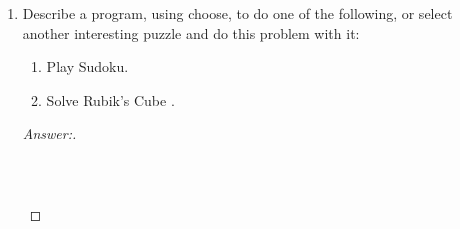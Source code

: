\documentclass[10pt]{article}
\begin{document}
\begin{enumerate}
\begin{enumerate}
\item
FIN (the set of finite languages) under the function $oddsL$, defined on languages as follows: $oddsL(L) = \{w : \exists x \in L (w = odds(x))\}$ 
\begin{proof}[Answer:]
Yes.
\end{proof}
\begin{proof}
The subset of a finite language must also be finite, and $oddsL(L) \subseteq L$, so FIN is closed under $oddsL$.
\end{proof}

\item
* INF (the set of infinite languages) under the function $oddsL$.
\begin{proof}[Answer:]
\end{proof}
\begin{proof}
\end{proof}

\item
FIN under the function $maxstring$, defined in Example 8.22.
\begin{proof}[Answer:]
Yes.
\end{proof}
\begin{proof}
The subset of a finite language must also be finite, and $maxstring(L) \subseteq L$, so FIN is closed under $maxstring$.
\end{proof}

\item
INF under the function $maxstring$. 
\begin{proof}[Answer:]
No.  The closure is INF $\cup$ FIN
\end{proof}
\begin{proof}
The language $a^*b^* \in$ INF.  $maxstring(a^*b^*) = \emptyset$, which is finite, and so not in INF.
\end{proof}
\end{enumerate}


\item
Describe a program, using choose, to do one of the following, or select another interesting puzzle and do this problem with it:
\begin{enumerate}

\item
Play Sudoku.

\item
Solve Rubik's Cube \textregistered .
\end{enumerate}
\begin{proof}[Answer:]
\begin{verbatim}



\end{verbatim}
\end{proof}
\end{enumerate}
\end{document}
